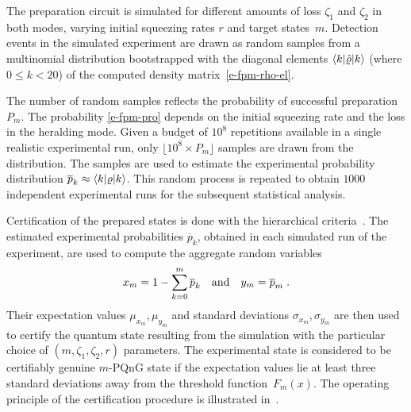 \documentclass{article}
\begin{document}
The preparation circuit is simulated for different amounts of loss $\zeta_{1}$ and $\zeta_{2}$ in both modes, varying initial squeezing rates $r$ and target states~${m}$. Detection events in the simulated experiment are drawn as random samples from a multinomial distribution bootstrapped with the diagonal elements $\braket{k|\hat{\varrho}|k}$ (where $0 \leq k < 20$) of the computed density matrix~\eqref{e-fpm-rho-el}. 

The number of random samples reflects the probability of successful preparation $P_{m}$. The probability \eqref{e-fpm-pro} depends on the initial squeezing rate and the loss in the heralding mode. Given a budget of $10^{8}$ repetitions available in a single realistic experimental run, only ${\lfloor 10^{8} \times P_{m} \rfloor}$ samples are drawn from the distribution. The samples are used to estimate the experimental probability distribution ${\overline{p}_{k} \approx \braket{k|\varrho|k}}$. This random process is repeated to obtain $1000$ independent experimental runs for the subsequent statistical analysis.


Certification of the prepared states is done with the hierarchical criteria~\cite{lachman2019}. 
%
The estimated experimental probabilities $\overline{p}_{k}$, obtained in each simulated run of the experiment, are used to compute the aggregate random variables
%
\begin{equation}
  x_{m} = 1 - \sum_{k = 0}^{m} \overline{p}_{k} 
  \quad\text{and}\quad
  y_{m} = \overline{p}_{m} 
  \;\text{.}
\end{equation}
%
Their expectation values $\mu_{x_{m}}, \mu_{y_{m}}$ and standard deviations $\sigma_{x_{m}}, \sigma_{y_{m}}$ are then used to certify the quantum state resulting from the simulation with the particular choice of $(m, \zeta_{1}, \zeta_{2}, r)$ parameters. The experimental state is considered to be certifiably genuine $m$-PQnG state if the expectation values lie at least three standard deviations away from the threshold function~$F_{m} (x)$. The operating principle of the certification procedure is illustrated in~.

%
\end{document}
